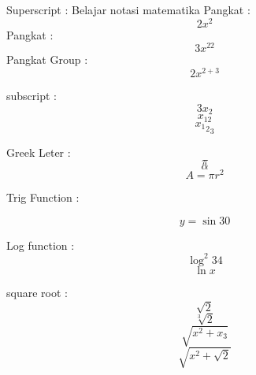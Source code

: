 \documentclass[12pt]{article}
\begin{document}
	Superscript : 
	Belajar notasi matematika 
	Pangkat : $$2x^2$$
	Pangkat : $$3x^22$$
	Pangkat Group : $$2x^{2+3}$$
	
	subscript : 
	$$3x_2$$
	$$x_{12}$$
	$${{x_1}_2}_3$$
	
	Greek Leter : 
	$$\pi$$
	$$\alpha$$
	$$A = \pi r^2$$
	
	Trig Function : 
	
	$$y = \sin{30}$$
	
	Log function : 
	$$ \log^2{34}$$
	$$\ln{x}$$
	
	square root : 
	$$\sqrt{2}$$
	$$\sqrt[3]{2}$$
	$$\sqrt{x^2+x_3}$$
	$$\sqrt{x^2+\sqrt{2}}$$
\end{document}
